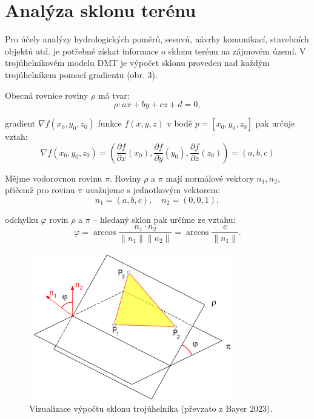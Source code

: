 \section*{Analýza sklonu terénu}
\par Pro účely analýzy hydrologických poměrů, sesuvů, návrhy komunikací, stavebních objektů atd. je potřebné získat informace o sklonu terénu na zájmovém území. V trojúhelníkovém modelu DMT je výpočet sklonu proveden nad každým trojúhelníkem pomocí gradientu (obr. 3). 
\par Obecná rovnice roviny $\rho$ má tvar:
\begin{equation*}
    \rho : ax + by + cz + d = 0,
\end{equation*}
\par gradient $\nabla f(x_0, y_0, z_0)$ funkce $f(x, y, z)$ v bodě $p = [x_0, y_0, z_0]$ pak určuje vztah: \vspace{10pt}
\begin{equation*}
    \nabla f (x_0, y_0, z_0) = \left(\frac{\partial f}{\partial x}(x_0), \frac{\partial f}{\partial y}(y_0), \frac{\partial f}{\partial z}(z_0)\right) = (a, b, c)
\end{equation*}
\par Mějme vodorovnou rovinu $\pi$. Roviny $\rho$ a $\pi$ mají normálové vektory $n_1, n_2$, přičemž pro rovinu $\pi$ uvažujeme s jednotkovým vektorem:
\begin{equation*}
    n_1 = (a, b, c), \quad n_2 = (0, 0, 1),
\end{equation*}
\par odchylku $\varphi$ rovin $\rho$ a $\pi$ – hledaný sklon pak určíme ze vztahu: \vspace{10pt}
\begin{equation*}
    \varphi = \arccos{\frac{n_1 \cdot n_2}{\|n_1\| \|n_2\|}} = \arccos{\frac{c}{\|n_1\|}}.
\end{equation*}
\begin{figure}[H]
\centering
\includegraphics[width=9cm]{images/slope.png} 
    \caption{Vizualizace výpočtu sklonu trojúhelníka (převzato z Bayer 2023).}
\end{figure}

